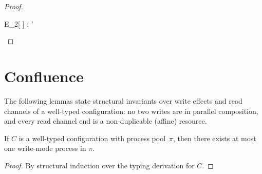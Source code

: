 \begin{theorem}[Preservation]
\begin{proof}
\begin{itemize}[leftmargin=*]
\begin{llproof}
{{        E_2[ \eUnit ]} : \PrTy'}{}      
    \end{llproof}
  \end{itemize}

\end{proof}
\end{theorem}


\section{Confluence}

The following lemmas state structural
invariants over write effects and read channels of a well-typed
configuration: no two writes are in parallel composition, and every read channel end is a non-duplicable (affine) resource.

\begin{lemma}
\label{lem:UniqueWriter}
If $C$ is a well-typed configuration with process pool~$\pi$, 
then there exists at most one write-mode process in $\pi$.
\begin{proof}
By structural induction over the typing derivation for $C$.
\end{proof}
\end{lemma}

